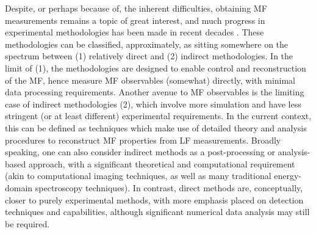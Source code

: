 \documentclass[10pt]{article}
\begin{document}
Despite, or perhaps because of, the inherent difficulties, obtaining  MF measurements remains a topic of great interest, and much progress in experimental methodologies has been made in recent decades \cite{Becker1998,Reid2003,Reid2012,kleinpoppen2013perfect,Yagishita2015,hockett2018QMP1}. 
These methodologies can be classified, approximately, as sitting somewhere on the spectrum between (1) relatively direct and (2) indirect methodologies. In the limit of (1), the methodologies are designed to enable control and reconstruction of the MF, hence measure MF observables (somewhat) directly, with minimal data processing requirements. Another avenue to MF observables is the limiting case of indirect methodologies (2), which involve more simulation and have less stringent (or at least different) experimental requirements. In the current context, this can be defined as techniques which make use of detailed theory and analysis procedures to reconstruct MF properties from LF measurements. Broadly speaking, one can also consider indirect methods as a post-processing or analysis-based approach, with a significant theoretical and computational requirement (akin to computational imaging techniques, as well as many traditional energy-domain spectroscopy techniques). In contrast, direct methods are, conceptually, closer to purely experimental methods, with more emphasis placed on detection techniques and capabilities, although significant numerical data analysis may still be required. 
\end{document}
